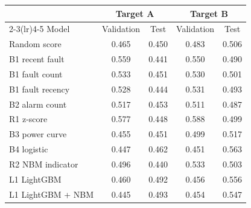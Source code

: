 \begin{tabular}{@{}lcccc@{}}
\toprule
 & \multicolumn{2}{c}{Target A} & \multicolumn{2}{c}{Target B} \\
\cmidrule(lr){2-3}\cmidrule(lr){4-5}
Model & Validation & Test & Validation & Test \\
\midrule
Random score & 0.465 & 0.450 & 0.483 & 0.506 \\
B1 recent fault & 0.559 & 0.441 & 0.550 & 0.490 \\
B1 fault count & 0.533 & 0.451 & 0.530 & 0.501 \\
B1 fault recency & 0.528 & 0.444 & 0.531 & 0.493 \\
B2 alarm count & 0.517 & 0.453 & 0.511 & 0.487 \\
R1 z-score & 0.577 & 0.448 & 0.588 & 0.499 \\
B3 power curve & 0.455 & 0.451 & 0.499 & 0.517 \\
B4 logistic & 0.447 & 0.462 & 0.451 & 0.563 \\
R2 NBM indicator & 0.496 & 0.440 & 0.533 & 0.503 \\
L1 LightGBM & 0.460 & 0.492 & 0.456 & 0.556 \\
L1 LightGBM + NBM & 0.445 & 0.493 & 0.454 & 0.547 \\
\bottomrule
\end{tabular}
